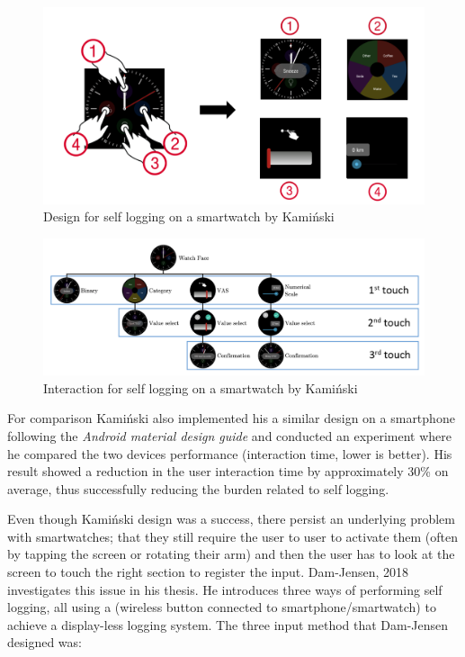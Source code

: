 \begin{figure}[h!]
    \centering
    \includegraphics[width=1\textwidth]{figures/tomas_design.png}
    \caption{Design for self logging on a smartwatch by Kami\'nski\cite{tomas}}
    \label{tomas_design}
\end{figure}

\begin{figure}[h!]
    \centering
    \includegraphics[width=1\textwidth]{figures/tomas_design2.png}
    \caption{Interaction for self logging on a smartwatch by Kami\'nski\cite{tomas}}
    \label{tomas_design2}
\end{figure}

For comparison Kami\'nski also implemented his a similar design on a smartphone following the \emph{Android material design guide}\cite{android_design} and conducted an experiment where he compared the two devices performance (interaction time, lower is better). His result showed a reduction in the user interaction time by approximately 30\% on average, thus successfully reducing the burden related to self logging. 

Even though Kami\'nski design was a success, there persist an underlying problem with smartwatches; that they still require the user to user to activate them (often by tapping the screen or rotating their arm) and then the user has to look at the screen to touch the right section to register the input. Dam-Jensen, 2018\cite{dam} investigates this issue in his thesis. He introduces three ways of performing self logging, all using a  (wireless button connected to smartphone/smartwatch) to achieve a display-less logging system. The three input method that Dam-Jensen designed was:

